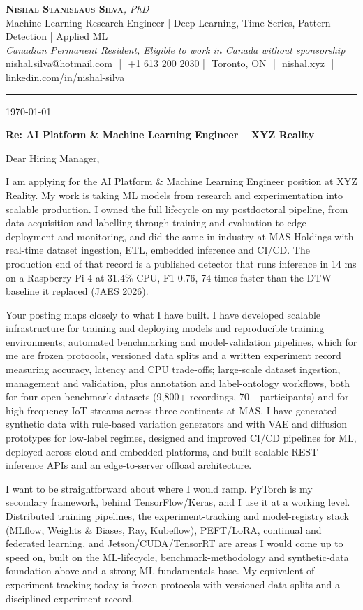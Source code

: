 \documentclass[11pt]{article}
\makeatletter
\newcommand{\clName}{Nishal Stanislaus Silva}
\newcommand{\clEmail}{nishal.silva@hotmail.com}
\newcommand{\clPhone}{+1 613 200 2030}
\newcommand{\clCity}{Toronto, ON}
\newcommand{\clSite}{https://nishal.xyz}
\newcommand{\clLinkedIn}{https://www.linkedin.com/in/nishal-silva}
\newcommand{\clStatus}{Canadian Permanent Resident, Eligible to work in Canada without sponsorship}
\newcommand{\clTagline}{Machine Learning Research Engineer | Deep Learning, Time-Series, Pattern Detection | Applied ML}
\newcommand{\clRole}{AI Platform \& Machine Learning Engineer}
\newcommand{\clCompany}{XYZ Reality}
\newcommand{\clAddressee}{Dear Hiring Manager,}
\makeatother
\begin{document}
\pagestyle{empty}
\begin{center}
    {\LARGE \scshape \textbf{\clName}}{\large \textit{, PhD}}\\[1pt]
    {\small \clTagline}\\[1pt]
    {\footnotesize\textit{\clStatus}}\\[1pt]
    {\small
    \href{mailto:\clEmail}{\clEmail} \,\,|\,\, \clPhone \,\,|\,\, \clCity
    \,\,|\,\, \href{\clSite}{nishal.xyz} \,\,|\,\, \href{\clLinkedIn}{linkedin.com/in/nishal-silva}}
\end{center}

\rule{\linewidth}{0.4pt}\vspace{0.6em}

\today

\textbf{Re: \clRole{} -- \clCompany{}}

\clAddressee

I am applying for the AI Platform \& Machine Learning Engineer position at XYZ Reality. My work is taking ML models from research and experimentation into scalable production. I owned the full lifecycle on my postdoctoral pipeline, from data acquisition and labelling through training and evaluation to edge deployment and monitoring, and did the same in industry at MAS Holdings with real-time dataset ingestion, ETL, embedded inference and CI/CD. The production end of that record is a published detector that runs inference in 14 ms on a Raspberry Pi 4 at 31.4\% CPU, F1 0.76, 74 times faster than the DTW baseline it replaced (JAES 2026).

Your posting maps closely to what I have built. I have developed scalable infrastructure for training and deploying models and reproducible training environments; automated benchmarking and model-validation pipelines, which for me are frozen protocols, versioned data splits and a written experiment record measuring accuracy, latency and CPU trade-offs; large-scale dataset ingestion, management and validation, plus annotation and label-ontology workflows, both for four open benchmark datasets (9,800+ recordings, 70+ participants) and for high-frequency IoT streams across three continents at MAS. I have generated synthetic data with rule-based variation generators and with VAE and diffusion prototypes for low-label regimes, designed and improved CI/CD pipelines for ML, deployed across cloud and embedded platforms, and built scalable REST inference APIs and an edge-to-server offload architecture.

I want to be straightforward about where I would ramp. PyTorch is my secondary framework, behind TensorFlow/Keras, and I use it at a working level. Distributed training pipelines, the experiment-tracking and model-registry stack (MLflow, Weights \& Biases, Ray, Kubeflow), PEFT/LoRA, continual and federated learning, and Jetson/CUDA/TensorRT are areas I would come up to speed on, built on the ML-lifecycle, benchmark-methodology and synthetic-data foundation above and a strong ML-fundamentals base. My equivalent of experiment tracking today is frozen protocols with versioned data splits and a disciplined experiment record.
\end{document}
